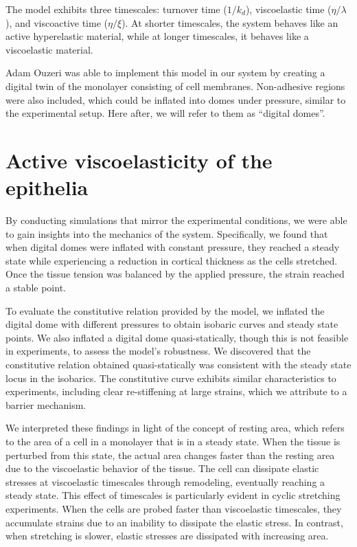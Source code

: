 The model exhibits three timescales: turnover time (\(1/k_d\)),
viscoelastic time (\(\eta/\lambda\)), and viscoactive time
(\(\eta/\xi\)). At shorter timescales, the system behaves like an active
hyperelastic material, while at longer timescales, it behaves like a
viscoelastic material.

Adam Ouzeri was able to implement this model in our system by creating a
digital twin of the monolayer consisting of cell membranes. Non-adhesive
regions were also included, which could be inflated into domes under
pressure, similar to the experimental setup. Here after, we will refer
to them as ``digital domes''.

\hypertarget{active-viscoelasticity-of-the-epithelia}{%
	\section{Active viscoelasticity of the
		epithelia}\label{active-viscoelasticity-of-the-epithelia}}

By conducting simulations that mirror the experimental conditions, we
were able to gain insights into the mechanics of the system.
Specifically, we found that when digital domes were inflated with
constant pressure, they reached a steady state while experiencing a
reduction in cortical thickness as the cells stretched. Once the tissue
tension was balanced by the applied pressure, the strain reached a
stable point.

To evaluate the constitutive relation provided by the model, we inflated
the digital dome with different pressures to obtain isobaric curves and
steady state points. We also inflated a digital dome quasi-statically,
though this is not feasible in experiments, to assess the model's
robustness. We discovered that the constitutive relation obtained
quasi-statically was consistent with the steady state locus in the
isobarics. The constitutive curve exhibits similar characteristics to
experiments, including clear re-stiffening at large strains, which we
attribute to a barrier mechanism.

We interpreted these findings in light of the concept of resting area,
which refers to the area of a cell in a monolayer that is in a steady
state. When the tissue is perturbed from this state, the actual area
changes faster than the resting area due to the viscoelastic behavior of
the tissue. The cell can dissipate elastic stresses at viscoelastic
timescales through remodeling, eventually reaching a steady state. This
effect of timescales is particularly evident in cyclic stretching
experiments. When the cells are probed faster than viscoelastic
timescales, they accumulate strains due to an inability to dissipate the
elastic stress. In contrast, when stretching is slower, elastic stresses
are dissipated with increasing area.


